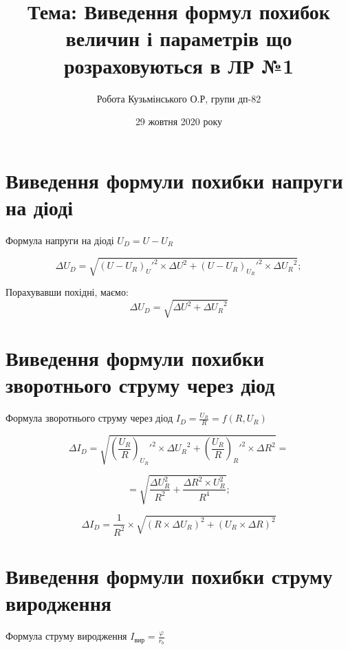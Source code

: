 \documentclass[a4paper,14pt]{article}
\date{29 жовтня 2020 року}
\title{Тема: Виведення формул похибок величин і параметрів що розраховуються в ЛР №1}
\author{Робота Кузьмінського О.Р, групи дп-82}
\begin{document}
\maketitle
\section{Виведення формули похибки напруги на діоді }
Формула напруги  на діоді $U_D=U-U_R$ 

\begin{equation}\label{eq:formula1}
\Delta{U_D}=\sqrt{(U-U_R)_U'^2\times{\Delta{U}^2}+(U-U_R)_{U_R}'^2\times{\Delta{U_R}^2 }           }  ;
\end{equation}

Порахувавши похідні, маємо:
\begin{equation}
  \boxed{   \Delta{U_D}=\sqrt{\Delta{U}^2+\Delta{U_R}^2}  }
\end{equation}

\section{Виведення формули похибки зворотнього струму через діод }
Формула зворотнього струму через діод  $I_D=\frac{U_R}{R}=f(R,U_R)$ 

\begin{equation}\label{eq:formula2}
\Delta{I_D}=\sqrt{\left(\frac{U_R}{R}\right)_{U_R}'^2\times{\Delta{U_R}^2}+\left(\frac{U_R}{R}\right)_{R}'^2\times{\Delta{R}^2}                                        }=
\end{equation}


\begin{equation}\label{eq:formula3}
=\sqrt{\frac{\Delta{U_R^2}}{R^2}+\frac{\Delta{R^2}\times{U_R^2}}{R^4}   };
\end{equation}


\begin{equation}\label{eq:formula4}
 \Delta{I_D} = \boxed{     \frac{1}{R^2}\times{ \sqrt{      (R\times{\Delta{U_R}})^2+(U_R\times{\Delta{R}})^2               }                 }                                                          }
\end{equation}

\section{Виведення формули похибки струму виродження }
Формула струму виродження  $I_{\text{вир}}=\frac{\varphi}{r_b}$ 
\end{document}

